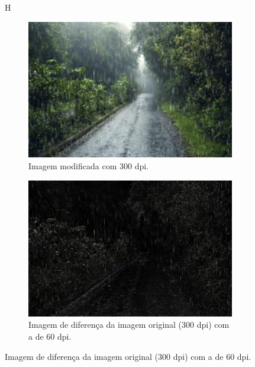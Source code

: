 \documentclass{article}
\begin{document}
\begin{figure}{H}
\begin{subfigure}[b]{0.3\textwidth}
        \includegraphics[width=\textwidth]{imgs/3.3.png}
        \caption{Imagem modificada com 300 dpi.}
    \end{subfigure}
    \hfill
    \caption{Imagens diferença da chuva.}
    \begin{subfigure}[b]{0.3\textwidth}
        \includegraphics[width=\textwidth]{imgs/dif3.1.png}
        \caption{Imagem de diferença da imagem original (300 dpi) com a de 60 dpi.}


\end{subfigure}
\end{figure}
\end{document}
